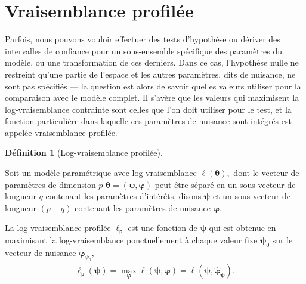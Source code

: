 \documentclass[
  11pt,
  letterpaper,
]{scrbook}
\theoremstyle{plain}
\theoremstyle{plain}
\theoremstyle{definition}
\theoremstyle{definition}
\newtheorem{definition}{Définition}[chapter]
\theoremstyle{remark}
\begin{document}
\section{Vraisemblance profilée}\label{vraisemblance-profiluxe9e}

Parfois, nous pouvons vouloir effectuer des tests d'hypothèse ou dériver
des intervalles de confiance pour un sous-ensemble spécifique des
paramètres du modèle, ou une transformation de ces derniers. Dans ce
cas, l'hypothèse nulle ne restreint qu'une partie de l'espace et les
autres paramètres, dits de nuisance, ne sont pas spécifiés --- la
question est alors de savoir quelles valeurs utiliser pour la
comparaison avec le modèle complet. Il s'avère que les valeurs qui
maximisent la log-vraisemblance contrainte sont celles que l'on doit
utiliser pour le test, et la fonction particulière dans laquelle ces
paramètres de nuisance sont intégrés est appelée vraisemblance profilée.

\begin{definition}[Log-vraisemblance
profilée]\protect\hypertarget{def-logvraisemblance}{}\label{def-logvraisemblance}

Soit un modèle paramétrique avec log-vraisemblance
\(\ell(\boldsymbol{\theta}),\) dont le vecteur de paramètres de
dimension \(p\)
\(\boldsymbol{\theta}=(\boldsymbol{\psi}, \boldsymbol{\varphi})\) peut
être séparé en un sous-vecteur de longueur \(q\) contenant les
paramètres d'intérêts, disons \(\boldsymbol{\psi}\) et un sous-vecteur
de longueur \((p-q)\) contenant les paramètres de nuisance
\(\boldsymbol{\varphi}.\)

La log-vraisemblance profilée \(\ell_{\mathsf{p}}\) est une fonction de
\(\boldsymbol{\psi}\) qui est obtenue en maximisant la log-vraisemblance
ponctuellement à chaque valeur fixe \(\boldsymbol{\psi}_0\) sur le
vecteur de nuisance \(\boldsymbol{\varphi}_{\psi_0},\) \begin{align*}
\ell_{\mathsf{p}}(\boldsymbol{\psi})=\max_{\boldsymbol{\varphi}}\ell(\boldsymbol{\psi}, \boldsymbol{\varphi})=\ell(\boldsymbol{\psi}, \widehat{\boldsymbol{\varphi}}_{\boldsymbol{\psi}}).
\end{align*}

\end{definition}
\end{document}
